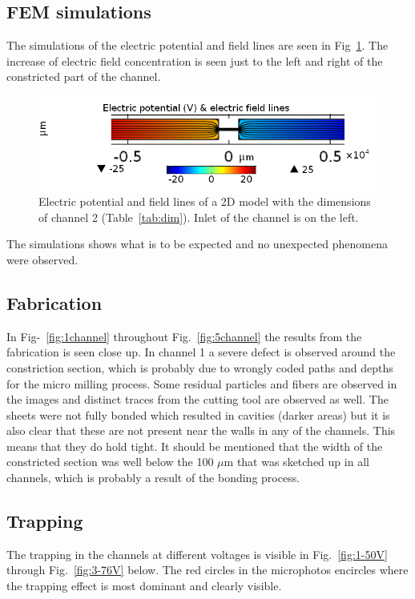 \documentclass[journal, a4paper]{IEEEtran}
\begin{document}
\subsection{FEM simulations}
The simulations of the electric potential and field lines are seen in Fig~\ref{fig:potField}. The increase of electric field concentration is seen just to the left and right of the constricted part of the channel.
\begin{figure}[!hbt]
	\begin{center}
		\includegraphics[width=\columnwidth]{potFieldW1000d100_new.png}
		\caption{\label{fig:potField} Electric potential and field lines of a 2D model with the dimensions of channel 2 (Table~\ref{tab:dim}). Inlet of the channel is on the left.}
	\end{center}
\end{figure}

The simulations shows what is to be expected and no unexpected phenomena were observed.

\subsection{Fabrication}
In Fig-~\ref{fig:1channel} throughout Fig.~\ref{fig:5channel} the results from the fabrication is seen close up. In channel 1 a severe defect is observed around the constriction section, which is probably due to wrongly coded paths and depths for the micro milling process. Some residual particles and fibers are observed in the images and distinct traces from the cutting tool are observed as well. The sheets were not fully bonded which resulted in cavities (darker areas) but it is also clear that these are not present near the walls in any of the channels. This means that they do hold tight. It should be mentioned that the width of the constricted section was well below the 100 $\mu$m that was sketched up in all channels, which is probably a result of the bonding process.

\subsection{Trapping}
The trapping in the channels at different voltages is visible in Fig.~\ref{fig:1-50V} 
through Fig.~\ref{fig:3-76V} below. The red circles in the microphotos encircles where the trapping effect is most dominant and clearly visible.
\end{document}
